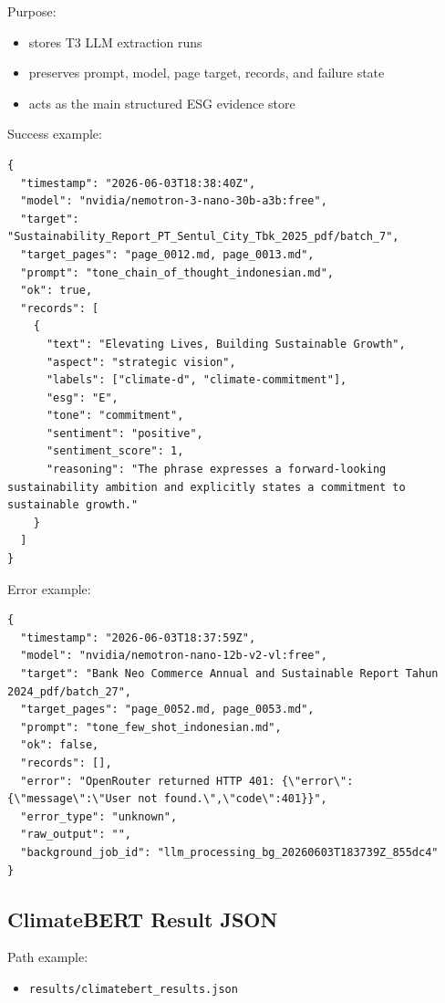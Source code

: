 Purpose:

\begin{itemize}
\tightlist
\item
  stores T3 LLM extraction runs
\item
  preserves prompt, model, page target, records, and failure state
\item
  acts as the main structured ESG evidence store
\end{itemize}

Success example:

\begin{verbatim}
{
  "timestamp": "2026-06-03T18:38:40Z",
  "model": "nvidia/nemotron-3-nano-30b-a3b:free",
  "target": "Sustainability_Report_PT_Sentul_City_Tbk_2025_pdf/batch_7",
  "target_pages": "page_0012.md, page_0013.md",
  "prompt": "tone_chain_of_thought_indonesian.md",
  "ok": true,
  "records": [
    {
      "text": "Elevating Lives, Building Sustainable Growth",
      "aspect": "strategic vision",
      "labels": ["climate-d", "climate-commitment"],
      "esg": "E",
      "tone": "commitment",
      "sentiment": "positive",
      "sentiment_score": 1,
      "reasoning": "The phrase expresses a forward-looking sustainability ambition and explicitly states a commitment to sustainable growth."
    }
  ]
}
\end{verbatim}

Error example:

\begin{verbatim}
{
  "timestamp": "2026-06-03T18:37:59Z",
  "model": "nvidia/nemotron-nano-12b-v2-vl:free",
  "target": "Bank Neo Commerce Annual and Sustainable Report Tahun 2024_pdf/batch_27",
  "target_pages": "page_0052.md, page_0053.md",
  "prompt": "tone_few_shot_indonesian.md",
  "ok": false,
  "records": [],
  "error": "OpenRouter returned HTTP 401: {\"error\":{\"message\":\"User not found.\",\"code\":401}}",
  "error_type": "unknown",
  "raw_output": "",
  "background_job_id": "llm_processing_bg_20260603T183739Z_855dc4"
}
\end{verbatim}

\subsection{ClimateBERT Result JSON}\label{climatebert-result-json}

Path example:

\begin{itemize}
\tightlist
\item
  \texttt{results/climatebert\_results.json}
\end{itemize}

